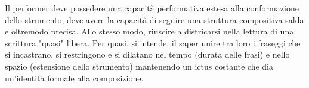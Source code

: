 Il performer deve possedere una capacità performativa estesa alla conformazione dello strumento,  deve avere la capacità di seguire una struttura compositiva salda e oltremodo precisa. Allo stesso modo, riuscire a districarsi nella lettura di una scrittura "quasi" libera. Per quasi, si intende, il saper unire tra loro i fraseggi che si incastrano, si restringono e si dilatano nel tempo (durata delle frasi) e nello spazio (estensione dello strumento) mantenendo un ictus costante che dia un'identità formale alla composizione.
